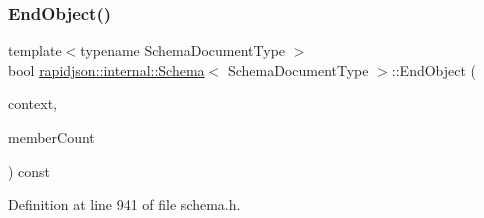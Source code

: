 \subsubsection{\texorpdfstring{EndObject()}{EndObject()}}
{\footnotesize\ttfamily template$<$typename Schema\+Document\+Type $>$ \\
bool \mbox{\hyperlink{classrapidjson_1_1internal_1_1_schema}{rapidjson\+::internal\+::\+Schema}}$<$ Schema\+Document\+Type $>$\+::End\+Object (\begin{DoxyParamCaption}\item[{\mbox{\hyperlink{classrapidjson_1_1internal_1_1_schema_afca06b1f51d1bc18403bdf3f4d55ffef}{Context}} \&}]{context,  }\item[{\mbox{\hyperlink{namespacerapidjson_a44eb33eaa523e36d466b1ced64b85c84}{Size\+Type}}}]{member\+Count }\end{DoxyParamCaption}) const}



Definition at line 941 of file schema.\+h.


